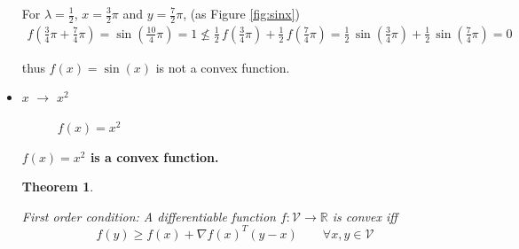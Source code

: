 \documentclass[paper=a4, fontsize=11pt]{scrartcl} %
\numberwithin{equation}{section} %
\numberwithin{figure}{section} %
\numberwithin{table}{section} %
\newtheorem{theorem}{Theorem}
\begin{document}
\begin{itemize}
For $\lambda = \frac{1}{2}$, $x = \frac{3}{2}\pi$ and $y = \frac{7}{2}\pi$, (as Figure \ref{fig:sinx})
\begin{align}
	f(\frac{3}{4}\pi + \frac{7}{4}\pi) = \sin(\frac{10}{4}\pi) = 1  \nleq \frac{1}{2} \, f(\frac{3}{4}\pi) + \frac{1}{2} \, f(\frac{7}{4}\pi) = \frac{1}{2} \, \sin(\frac{3}{4}\pi) + \frac{1}{2} \, \sin(\frac{7}{4}\pi) = 0
\end{align}

thus $f(x) = \sin(x)$ is not a convex function. 
	
	\item $x$ $\rightarrow$ $x^2$

\begin{figure}[H]
\vspace{-5mm}
\caption{$f(x) = x^2$\label{fig:xsq}}
\centering
\noindent{}
\end{figure}

\textbf{$f(x) = x^2$ is a convex function.} \\

\begin{theorem}	\label{thm:firstorder}

First order condition: A differentiable function $f: \mathcal{V} \rightarrow \mathbb{R}$ is convex iff
\begin{equation}
	f(y) \geq f(x) + \nabla f(x)^T(y-x) \qquad \forall x, y \in \mathcal{V}
\end{equation}
\end{theorem}


\end{itemize}
\end{document}
